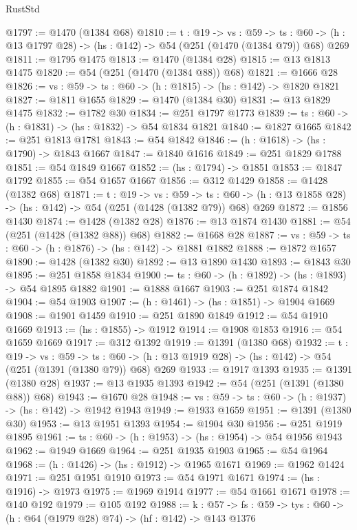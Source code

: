 \begin{lexlean}{RustStd}
\begin{coremodule}
@1797 := @1470 (@1384 @68)
@1810 := {t : @19} ->
  {vs : @59} ->
  {ts : @60} -> (h : @13 @1797 @28) -> (hs : @142) -> @54 (@251 (@1470 (@1384 @79)) @68) @269
@1811 := @1795 @1475
@1813 := @1470 (@1384 @28)
@1815 := @13 @1813 @1475
@1820 := @54 (@251 (@1470 (@1384 @88)) @68)
@1821 := @1666 @28
@1826 := {vs : @59} -> {ts : @60} -> (h : @1815) -> (hs : @142) -> @1820 @1821
@1827 := @1811 @1655
@1829 := @1470 (@1384 @30)
@1831 := @13 @1829 @1475
@1832 := @1782 @30
@1834 := @251 @1797 @1773
@1839 := {ts : @60} -> (h : @1831) -> (hs : @1832) -> @54 @1834 @1821
@1840 := @1827 @1665
@1842 := @251 @1813 @1781
@1843 := @54 @1842
@1846 := (h : @1618) -> (hs : @1790) -> @1843 @1667
@1847 := @1840 @1616
@1849 := @251 @1829 @1788
@1851 := @54 @1849 @1667
@1852 := (hs : @1794) -> @1851
@1853 := @1847 @1792
@1855 := @54 @1657 @1667
@1856 := @312 @1429
@1858 := @1428 (@1382 @68)
@1871 := {t : @19} ->
  {vs : @59} ->
  {ts : @60} -> (h : @13 @1858 @28) -> (hs : @142) -> @54 (@251 (@1428 (@1382 @79)) @68) @269
@1872 := @1856 @1430
@1874 := @1428 (@1382 @28)
@1876 := @13 @1874 @1430
@1881 := @54 (@251 (@1428 (@1382 @88)) @68)
@1882 := @1668 @28
@1887 := {vs : @59} -> {ts : @60} -> (h : @1876) -> (hs : @142) -> @1881 @1882
@1888 := @1872 @1657
@1890 := @1428 (@1382 @30)
@1892 := @13 @1890 @1430
@1893 := @1843 @30
@1895 := @251 @1858 @1834
@1900 := {ts : @60} -> (h : @1892) -> (hs : @1893) -> @54 @1895 @1882
@1901 := @1888 @1667
@1903 := @251 @1874 @1842
@1904 := @54 @1903
@1907 := (h : @1461) -> (hs : @1851) -> @1904 @1669
@1908 := @1901 @1459
@1910 := @251 @1890 @1849
@1912 := @54 @1910 @1669
@1913 := (hs : @1855) -> @1912
@1914 := @1908 @1853
@1916 := @54 @1659 @1669
@1917 := @312 @1392
@1919 := @1391 (@1380 @68)
@1932 := {t : @19} ->
  {vs : @59} ->
  {ts : @60} -> (h : @13 @1919 @28) -> (hs : @142) -> @54 (@251 (@1391 (@1380 @79)) @68) @269
@1933 := @1917 @1393
@1935 := @1391 (@1380 @28)
@1937 := @13 @1935 @1393
@1942 := @54 (@251 (@1391 (@1380 @88)) @68)
@1943 := @1670 @28
@1948 := {vs : @59} -> {ts : @60} -> (h : @1937) -> (hs : @142) -> @1942 @1943
@1949 := @1933 @1659
@1951 := @1391 (@1380 @30)
@1953 := @13 @1951 @1393
@1954 := @1904 @30
@1956 := @251 @1919 @1895
@1961 := {ts : @60} -> (h : @1953) -> (hs : @1954) -> @54 @1956 @1943
@1962 := @1949 @1669
@1964 := @251 @1935 @1903
@1965 := @54 @1964
@1968 := (h : @1426) -> (hs : @1912) -> @1965 @1671
@1969 := @1962 @1424
@1971 := @251 @1951 @1910
@1973 := @54 @1971 @1671
@1974 := (hs : @1916) -> @1973
@1975 := @1969 @1914
@1977 := @54 @1661 @1671
@1978 := @140 @192
@1979 := @105 @192
@1988 := {k : @57} ->
  {fs : @59} -> {tys : @60} -> (h : @64 (@1979 @28) @74) -> (hf : @142) -> @143 @1376

\end{coremodule}
\end{lexlean}
